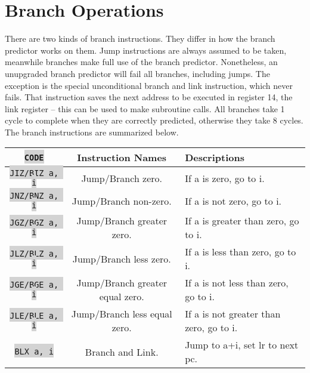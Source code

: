\documentclass{article}
\newcommand{\vnscode}[1]{\colorbox{lightgray}{\lstinline[language=vns]{#1}}}
\begin{document}
\section*{Branch Operations}

There are two kinds of branch instructions. They differ in how the branch
predictor works on them. Jump instructions are always assumed to be taken,
meanwhile branches make full use of the branch predictor. Nonetheless, an
unupgraded branch predictor will fail all branches, including jumps. The
exception is the special unconditional branch and link instruction, which never
fails. That instruction saves the next address to be executed in register 14,
the link register -- this can be used to make subroutine calls. All branches
take 1 cycle to complete when they are correctly predicted, otherwise they take
8 cycles. The branch instructions are summarized below.


\begin{tabular}{|c|c|l|}
    \hline \vnscode{CODE} & Instruction Names & Descriptions \\ \hline
    \vnscode{JIZ/BIZ a, i} & Jump/Branch zero. & If a is zero, go to i. \\ \hline
    \vnscode{JNZ/BNZ a, i} & Jump/Branch non-zero. & If a is not zero, go to i. \\ \hline
    \vnscode{JGZ/BGZ a, i} & Jump/Branch greater zero. & If a is greater than zero, go to i. \\ \hline
    \vnscode{JLZ/BLZ a, i} & Jump/Branch less zero. & If a is less than zero, go to i. \\ \hline
    \vnscode{JGE/BGE a, i} & Jump/Branch greater equal zero. & If a is not less than zero, go to i. \\ \hline
    \vnscode{JLE/BLE a, i} & Jump/Branch less equal zero. & If a is not greater than zero, go to i. \\ \hline
    \vnscode{BLX a, i} & Branch and Link. & Jump to a+i, set lr to next pc. \\ \hline
\end{tabular}
\end{document}
